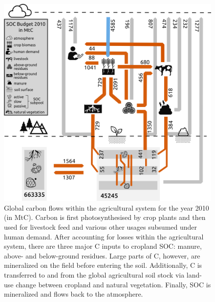 \documentclass[gc, manuscript]{copernicus}
\begin{document}
\begin{figure}[h]
\includegraphics[width=16cm]{../ResultNotebooks/Output/Images/CarbonBudget} \caption{Global carbon flows within the agricultural system for the year 2010 (in MtC). Carbon is first photosynthesised by crop plants and then used for livestock feed and various other usages subsumed under human demand. After accounting for losses within the agricultural system, there are three major C inputs to cropland SOC: manure, above- and below-ground residues. Large parts of C, however, are mineralized on the field before entering the soil. Additionally, C is transferred to and from the global agricultural soil stock via land-use change between cropland and natural vegetation. Finally, SOC is mineralized and flows back to the atmosphere.}\label{fig:FlowFig}
\end{figure}
\end{document}
